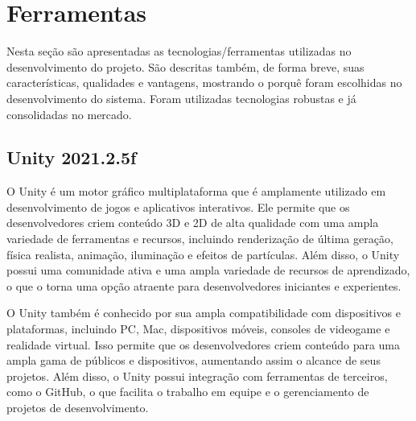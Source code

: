 \chapter{Ferramentas}
\label{ferramentas}
Nesta seção são apresentadas as tecnologias/ferramentas utilizadas no desenvolvimento do projeto. São descritas também, de forma breve, suas características, qualidades e vantagens, mostrando o porquê foram escolhidas no desenvolvimento do sistema. Foram utilizadas tecnologias robustas e já consolidadas no mercado. 
\section{Unity 2021.2.5f}
O Unity é um motor gráfico multiplataforma que é amplamente utilizado em desenvolvimento de jogos e aplicativos interativos. Ele permite que os desenvolvedores criem conteúdo 3D e 2D de alta qualidade com uma ampla variedade de ferramentas e recursos, incluindo renderização de última geração, física realista, animação, iluminação e efeitos de partículas. Além disso, o Unity possui uma comunidade ativa e uma ampla variedade de recursos de aprendizado, o que o torna uma opção atraente para desenvolvedores iniciantes e experientes.

O Unity também é conhecido por sua ampla compatibilidade com dispositivos e plataformas, incluindo PC, Mac, dispositivos móveis, consoles de videogame e realidade virtual. Isso permite que os desenvolvedores criem conteúdo para uma ampla gama de públicos e dispositivos, aumentando assim o alcance de seus projetos. Além disso, o Unity possui integração com ferramentas de terceiros, como o GitHub, o que facilita o trabalho em equipe e o gerenciamento de projetos de desenvolvimento. \cite{unity}
\pagebreak
